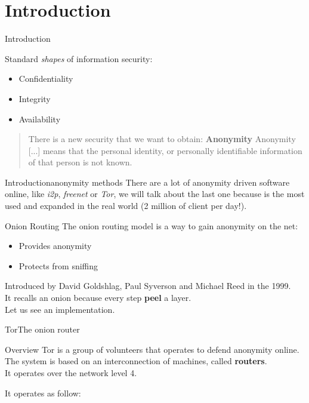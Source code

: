 \section{Introduction}
\begin{frame}{Introduction}{}
\begin{block}{Standard \emph{shapes} of information security:}
	\begin{itemize}
		\item Confidentiality
		\item Integrity
		\item Availability
	\end{itemize}
\end{block}
\begin{quote}
	There is a new security that we want to obtain: \textbf{Anonymity}
	Anonymity [...] means that the personal identity,
	or personally identifiable information of that person is not known.
\end{quote}
\end{frame}

\begin{frame}{Introduction}{anonymity methods}
There are a lot of anonymity driven software online, like \textit{i2p},
\textit{freenet} or \textit{Tor}, we will talk about the last one because
is the most used and expanded in the real world
(2 million of client per day!).
\end{frame}

\begin{frame}{Onion Routing}{}
The onion routing model is a way to gain anonymity on the net:
\begin{itemize}
	\item Provides anonymity
	\item Protects from sniffing
\end{itemize}
Introduced by David Goldshlag, Paul Syverson and Michael Reed in the 1999.
\\
It recalls an onion because every step \textbf{peel} a layer.
\\
Let us see an implementation.
\end{frame}

\begin{frame}{Tor}{The onion router}
\begin{block}{Overview}
Tor is a group of volunteers that operates to defend anonymity online.\\
The system is based on an interconnection of machines, called \textbf{routers}.\\
It operates over the network level 4.
\end{block}
It operates as follow:
\end{frame}

